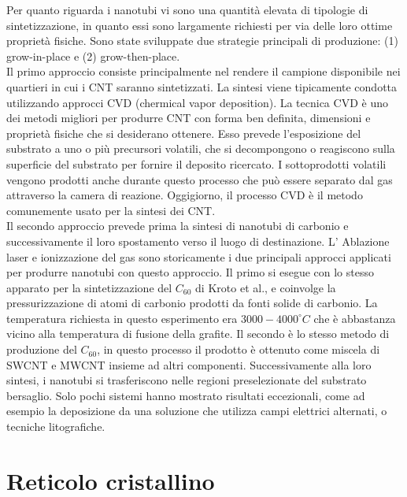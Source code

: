 \documentclass[a4paper,titlepage]{book}
\begin{document}
Per quanto riguarda i nanotubi vi sono una quantità elevata di tipologie di sintetizzazione, in quanto essi sono largamente richiesti per via delle loro ottime proprietà fisiche. Sono state sviluppate due strategie principali di produzione: (1) grow-in-place e (2) grow-then-place.\\
Il primo approccio consiste principalmente nel rendere il campione disponibile nei quartieri in cui i CNT saranno sintetizzati. La sintesi viene tipicamente condotta utilizzando approcci CVD (chermical vapor deposition). La tecnica CVD è uno dei metodi migliori per produrre CNT con forma ben definita, dimensioni e proprietà fisiche che si desiderano ottenere.  Esso prevede l'esposizione del substrato a uno o più precursori volatili, che si decompongono o reagiscono sulla superficie del substrato per fornire il deposito ricercato. I sottoprodotti volatili vengono prodotti anche durante questo processo che può essere separato dal gas attraverso la camera di reazione. Oggigiorno, il processo CVD è il metodo comunemente usato per la sintesi dei CNT.\\
Il secondo approccio prevede prima la sintesi di nanotubi di carbonio e successivamente il loro spostamento verso il luogo di destinazione. L' Ablazione laser e ionizzazione del gas sono storicamente i due principali approcci applicati per produrre nanotubi con questo approccio.
Il primo si esegue con lo stesso apparato per la sintetizzazione del $C_ {60}$ di Kroto et al., e coinvolge la pressurizzazione di atomi di carbonio prodotti da fonti solide di carbonio. La temperatura richiesta in questo esperimento era $3000-4000 ^\circ C$ che è abbastanza vicino alla temperatura di fusione della grafite.
Il secondo è lo stesso metodo di produzione del $C_ {60}$, in questo processo il prodotto è ottenuto come miscela di SWCNT e MWCNT insieme ad altri componenti.
Successivamente alla loro sintesi, i nanotubi si trasferiscono nelle regioni preselezionate del substrato bersaglio. Solo pochi sistemi hanno mostrato risultati eccezionali, come ad esempio la deposizione da una soluzione che utilizza campi elettrici alternati, o tecniche litografiche.
\section{Reticolo cristallino}
\end{document}
